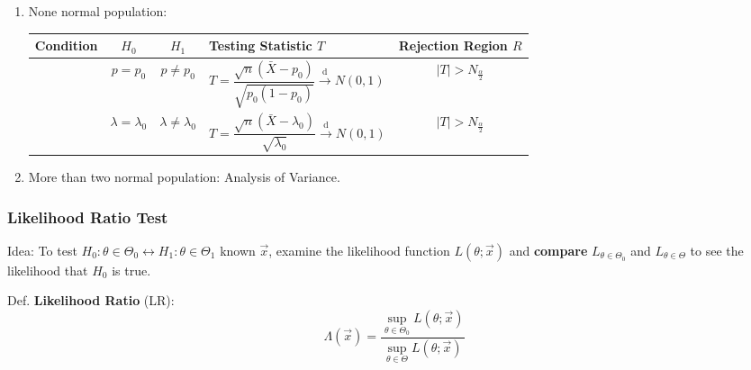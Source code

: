 \begin{enumerate}
\begin{table}[htbp]
\begin{tabularx}{\linewidth}{|c|c|c|Y|c|}
                &$\sigma_1^2\geq\sigma_2^2$&$\sigma_1^2<\sigma_2^2$&&$T>F_{n-1,m-1,\alpha}$\\
                &$\sigma_1^2\leq\sigma_2^2$&$\sigma_1^2>\sigma_2^2$&&$T<F_{n-1,m-1,1-\alpha}$\\
                \hline
        \end{tabularx}
    \end{table}

    \item None normal population:
    
    \begin{table}[htbp]
        \centering
        \renewcommand\arraystretch{1.7}
        \begin{tabularx}{\linewidth}{|c|c|c|Y|c|}
            \hline
            Condition&$H_0$&$H_1$&Testing Statistic $T$&Rejection Region $R$\\
            \hline
            &$p=p_0$&$p\neq p_0$&$T=\dfrac{\sqrt{n}(\bar{X}-p_0)}{\sqrt{p_0(1-p_0)}}\xrightarrow[]{\mathrm{d}}N(0,1)$&$|T|>N_\frac{\alpha}{2}$\\
            \hline
            &$\lambda=\lambda_0$&$\lambda\neq \lambda_0$&$T=\dfrac{\sqrt{n}(\bar{X}-\lambda_0)}{\sqrt{\lambda_0}}\xrightarrow[]{\mathrm{d}}N(0,1)$&$|T|>N_\frac{\alpha}{2}$\\
            \hline
        \end{tabularx}
    \end{table}
    \item More than two normal population: Analysis of Variance.
\end{enumerate}

\subsubsection{Likelihood Ratio Test}\label{SubSectionLRT}
    Idea: To test $H_0:\theta\in\Theta_0\longleftrightarrow H_1:\theta\in\Theta_1$ known $\vec{x}$, examine the likelihood function $L(\theta;\vec{x})$ and \textbf{compare} $L_{\theta\in\Theta_0}$ and $L_{\theta\in\Theta}$ to see the likelihood that $H_0$ is true.

    Def. \textbf{Likelihood Ratio} (LR):
    \begin{equation}
    \Lambda (\vec{x})=\dfrac{{\displaystyle\sup_{\theta\in\Theta_0}L(\theta;\vec{x})}}{{\displaystyle\sup_{\theta\in\Theta}L(\theta;\vec{x})}}
    \end{equation}

